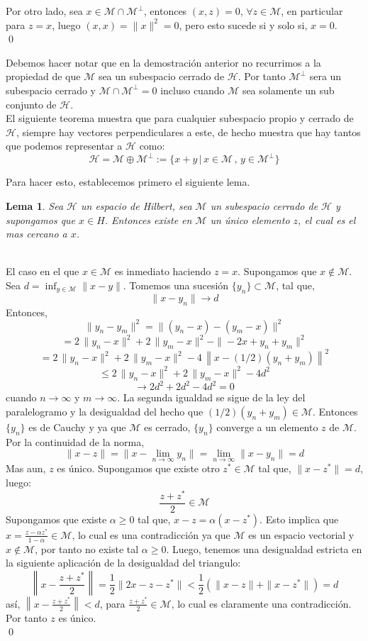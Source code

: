 \documentclass[12pt]{book}
\numberwithin{equation}{chapter}
\newtheorem{lemma}[theorem]{Lema}
\def\n{\noindent}
\def\rar{\rightarrow}
\def\H{\mathcal{H}}
\def\M{\mathcal{M}}
\begin{document}
Por otro lado, sea $ x \in \M \cap \M^{\perp} $, entonces $ (x,z)=0 $, $\forall z \in \M $, en particular para $z=x$, luego $ (x,x)= \|x\|^{2}=0 $, pero esto sucede si y solo si, $x=0$.\\ \qed

\vspace{5 mm}

Debemos hacer notar que en la demostraci\'on anterior no recurrimos a la propiedad de que $\M$ sea un subespacio cerrado de $\H$. Por tanto $\M^{\perp}$ sera un subespacio cerrado y $\M \cap \M^{\perp}=0$ incluso cuando $\M$ sea solamente un sub conjunto de $\H$.\\

El siguiente teorema muestra que para cualquier subespacio propio y cerrado de $\H$, siempre hay vectores perpendiculares a este, de hecho muestra que hay tantos que podemos representar a $\H$ como:
$$ \H = \M \oplus \M^{\perp} := \{ x+y \,|\, x\in\M \,,\, y \in \M^{\perp} \} $$

\n Para hacer esto, establecemos primero el siguiente lema.

\begin{lemma}
Sea $\H$ un espacio de Hilbert, sea $\M$ un subespacio cerrado de $\H$ y supongamos que $x \in H$. Entonces existe en $\M$ un \'unico elemento $z$, el cual es el mas cercano a $x$.
\end{lemma}
\n {\bf Demostraci\'on}\\
El caso en el que $x \in \M$ es inmediato haciendo $z=x$. Supongamos que $x \notin \M$.\\
Sea $d= \inf_{y \in \M} \|x-y\|$. Tomemos una sucesi\'on $ \{y_{n}\} \subset \M $, tal que,
$$ \| x-y_{n} \| \rar d $$
Entonces,
$$ \| y_{n}-y_{m} \|^{2}= \| (y_{n}-x) - (y_{m}-x) \|^{2} $$  
$$ = 2\,\| y_{n}-x \|^{2} + 2\,\| y_{m}-x \|^{2} - \| -2x+y_{n}+y_{m} \|^{2} $$
$$ = 2\,\| y_{n}-x \|^{2} + 2\,\| y_{m}-x \|^{2} - 4\,\left\| x- (1/2)(y_{n}+y_{m}) \right\|^{2} $$
$$ \leq 2\,\| y_{n}-x \|^{2} + 2\,\| y_{m}-x \|^{2} - 4 d^{2} $$
$$ \longrightarrow 2d^{2} + 2d^{2} - 4d^{2} =0  $$
cuando $n \rar \infty$ y $m \rar \infty$. 
La segunda igualdad se sigue de la ley del paralelogramo y la desigualdad del hecho que $ (1/2)(y_{n}+y_{m}) \in \M $. Entonces $\{y_{n}\}$ es de Cauchy y ya que $\M$ es cerrado, $\{y_{n}\}$ converge a un elemento $z $ de $\M$. Por la continuidad de la norma, 
$$ \|x-z\|= \| x - \lim_{n \rar \infty} y_{n} \|= \lim_{n \rar \infty} \|x-y_{n}\|= d $$ 
Mas aun, $z$ es \'unico. Supongamos que existe otro $z^{*} \in \M$ tal que, $\|x-z^{*}\|=d$, luego: 
$$ \frac{z+z^{*}}{2} \in \M $$
Supongamos que existe $\alpha \geq 0$ tal que, $ x-z=\alpha(x-z^{*}) $. Esto implica que $x = \frac{z-\alpha z^{*}}{1-\alpha} \in \M$, lo cual es una contradicci\'on ya que $\M$ es un espacio vectorial y $x \notin \M$, por tanto no existe tal $\alpha \geq 0$. Luego, tenemos una desigualdad estricta en la siguiente aplicaci\'on de la desigualdad del triangulo:
$$ \left\| x- \frac{z+z^{*}}{2} \right\| = \frac{1}{2} \| 2x-z-z^{*} \| < \frac{1}{2} ( \|x-z\| + \|x-z^{*}\| )= d $$
as\'i, $\left\| x- \frac{z+z^{*}}{2} \right\| < d$, para $ \frac{z+z^{*}}{2} \in \M $, lo cual es claramente una contradicci\'on. Por tanto $z$ es \'unico. \\ \qed
\end{document}
